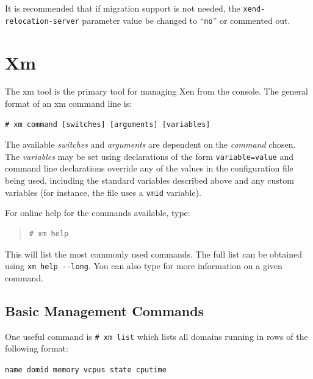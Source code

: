 \documentclass[11pt,twoside,final,openright]{report}
\begin{document}
It is recommended that if migration support is not needed, the
\texttt{xend-relocation-server} parameter value be changed to
``\texttt{no}'' or commented out.

\section{Xm}
\label{s:xm}

The xm tool is the primary tool for managing Xen from the console. The
general format of an xm command line is:

\begin{verbatim}
# xm command [switches] [arguments] [variables]
\end{verbatim}

The available \emph{switches} and \emph{arguments} are dependent on the
\emph{command} chosen. The \emph{variables} may be set using
declarations of the form {\tt variable=value} and command line
declarations override any of the values in the configuration file being
used, including the standard variables described above and any custom
variables (for instance, the  file uses a {\tt vmid}
variable).

For online help for the commands available, type:

\begin{quote}
\begin{verbatim}
# xm help
\end{verbatim}
\end{quote}

This will list the most commonly used commands.  The full list can be obtained
using \verb_xm help --long_.  You can also type 
for more information on a given command.

\subsection{Basic Management Commands}

One useful command is \verb_# xm list_ which lists all domains running in rows
of the following format:
\begin{center} {\tt name domid memory vcpus state cputime}
\end{center}
\end{document}
